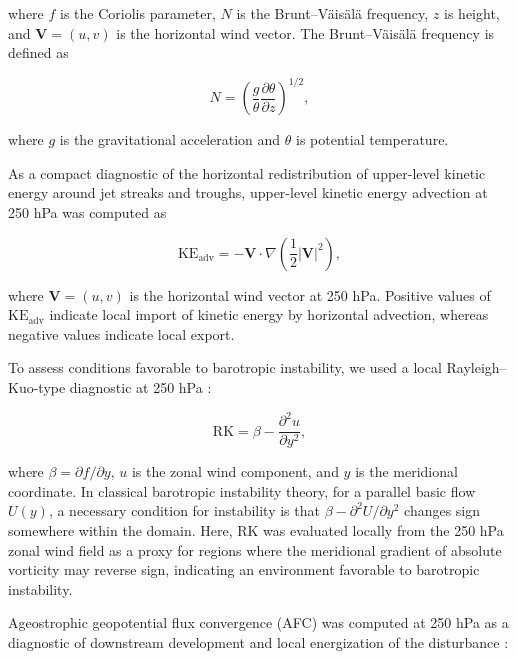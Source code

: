 \documentclass[pdflatex,sn-chicago]{sn-jnl}%
\theoremstyle{plain}
\theoremstyle{definition}
\theoremstyle{remark}
\theoremstyle{definition}
\begin{document}
where \(f\) is the Coriolis parameter, \(N\) is the Brunt--V\"ais\"al\"a frequency, \(z\) is height, and \(\mathbf{V}=(u,v)\) is the horizontal wind vector. The Brunt--V\"ais\"al\"a frequency is defined as

\begin{equation}
N = \left( \frac{g}{\theta} \frac{\partial \theta}{\partial z} \right)^{1/2},
\end{equation}

where \(g\) is the gravitational acceleration and \(\theta\) is potential temperature.

As a compact diagnostic of the horizontal redistribution of upper-level kinetic energy around jet streaks and troughs, upper-level kinetic energy advection at 250 hPa was computed as

\begin{equation}
\mathrm{KE}_{\mathrm{adv}}
=
-\mathbf{V}\cdot\nabla\left(\frac{1}{2}\lvert \mathbf{V}\rvert^2\right),
\end{equation}

where \(\mathbf{V}=(u,v)\) is the horizontal wind vector at 250 hPa. Positive values of \(\mathrm{KE}_{\mathrm{adv}}\) indicate local import of kinetic energy by horizontal advection, whereas negative values indicate local export.

To assess conditions favorable to barotropic instability, we used a local Rayleigh--Kuo-type diagnostic at 250 hPa \citep{rayleigh1895stability,kuo1949dynamic}:

\begin{equation}
\mathrm{RK}
=
\beta - \frac{\partial^2 u}{\partial y^2},
\end{equation}

where \(\beta = \partial f/\partial y\), \(u\) is the zonal wind component, and \(y\) is the meridional coordinate. In classical barotropic instability theory, for a parallel basic flow \(U(y)\), a necessary condition for instability is that \(\beta - \partial^2 U/\partial y^2\) changes sign somewhere within the domain. Here, \(\mathrm{RK}\) was evaluated locally from the 250 hPa zonal wind field as a proxy for regions where the meridional gradient of absolute vorticity may reverse sign, indicating an environment favorable to barotropic instability.


Ageostrophic geopotential flux convergence (AFC) was computed at 250 hPa as a diagnostic of downstream development and local energization of the disturbance \citep[e.g.][]{orlanski1991life,orlanski1993ageostrophic}:
\end{document}
